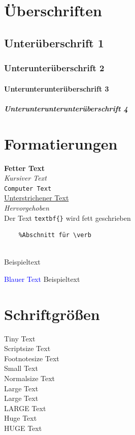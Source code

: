 \section{Überschriften}
\subsection{Unterüberschrift 1}
\subsubsection{Unterunterüberschrift 2}
\paragraph{Unterunterunterüberschrift 3}
\subparagraph{Unterunterunterunterüberschrift 4}

\section{Formatierungen}
\textbf{Fetter Text} \\
\textit{Kursiver Text} \\
\texttt{Computer Text} \\
\underline{Unterstrichener Text} \\
\emph{Hervorgehoben} \\

Der Text \verb|textbf{}| wird fett geschrieben

\begin{verbatim}
    %Abschnitt für \verb
\end{verbatim}

\color{red}{Roter Text} \\
Beispieltext

\textcolor{blue}{Blauer Text}
Beispieltext

{
    \color{green}{grüner Text}
}

\section{Schriftgrößen}
{\tiny Tiny Text} \\
{\scriptsize Scriptsize Text} \\
{\footnotesize Footnotesize Text} \\
{\small Small Text} \\
{\normalsize Normalsize Text} \\
{\large Large Text} \\
{\Large Large Text} \\
{\LARGE LARGE Text} \\
{\huge Huge Text} \\
{\Huge HUGE Text} \\

